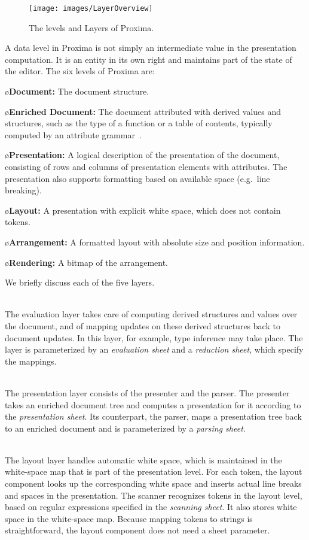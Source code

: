 \documentclass{article}[10pt]
\begin{document}
\begin{figure}[ht]
\centering
\texttt{[image: images/LayerOverview]}
\caption{The levels and Layers of Proxima.}
\label{fig:levelsAndLayers}
\end{figure}

A data level in Proxima is not simply an intermediate value in the presentation computation. It is an entity in its own right and maintains part of the state of the editor. The six levels of Proxima are:


\bl
\o {\bf Document:} The document structure.

\o {\bf Enriched Document:} The document attributed with derived values and structures, such as the type of a function or a table of contents, typically computed by an attribute grammar~\cite{reps84synGen}.

\o{\bf Presentation:} A logical description of the presentation of the document, consisting of rows and columns of presentation elements with attributes. The presentation also supports formatting based on available space (e.g.\ line breaking).

\o{\bf Layout:} A presentation with explicit white space, which does not contain tokens.

\o{\bf Arrangement:} A formatted layout with absolute size and position information.

\o{\bf Rendering:} A bitmap of the arrangement.
\el

\pagebreak

\bc
We briefly discuss each of the five layers.

\\
The evaluation layer takes care of computing derived structures and values over the document, and of mapping updates on these derived structures back to document updates. In this layer, for example, type inference may take place. The layer is parameterized by an {\em evaluation sheet} and a {\em reduction sheet}, which specify the mappings. 

\\
The presentation layer consists of the presenter and the parser. The presenter takes an enriched document tree and computes a presentation for it according to the {\em presentation sheet}. Its counterpart, the parser, maps a presentation tree back to an enriched document and is parameterized by a {\em parsing sheet}.

\\
The layout layer handles automatic white space, which is maintained in the white-space map that is part of the presentation level. For each token, the layout component looks up the corresponding white space and inserts actual line breaks and spaces in the presentation. The scanner recognizes tokens in the layout level, based on regular expressions specified in the {\em scanning sheet}. It also stores white space in the white-space map. Because mapping tokens to strings is straightforward, the layout component does not need a sheet parameter.
\end{document}
